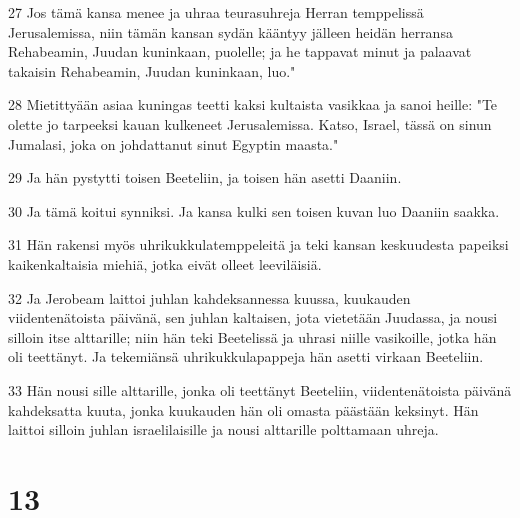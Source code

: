 \par 27 Jos tämä kansa menee ja uhraa teurasuhreja Herran temppelissä Jerusalemissa, niin tämän kansan sydän kääntyy jälleen heidän herransa Rehabeamin, Juudan kuninkaan, puolelle; ja he tappavat minut ja palaavat takaisin Rehabeamin, Juudan kuninkaan, luo."
\par 28 Mietittyään asiaa kuningas teetti kaksi kultaista vasikkaa ja sanoi heille: "Te olette jo tarpeeksi kauan kulkeneet Jerusalemissa. Katso, Israel, tässä on sinun Jumalasi, joka on johdattanut sinut Egyptin maasta."
\par 29 Ja hän pystytti toisen Beeteliin, ja toisen hän asetti Daaniin.
\par 30 Ja tämä koitui synniksi. Ja kansa kulki sen toisen kuvan luo Daaniin saakka.
\par 31 Hän rakensi myös uhrikukkulatemppeleitä ja teki kansan keskuudesta papeiksi kaikenkaltaisia miehiä, jotka eivät olleet leeviläisiä.
\par 32 Ja Jerobeam laittoi juhlan kahdeksannessa kuussa, kuukauden viidentenätoista päivänä, sen juhlan kaltaisen, jota vietetään Juudassa, ja nousi silloin itse alttarille; niin hän teki Beetelissä ja uhrasi niille vasikoille, jotka hän oli teettänyt. Ja tekemiänsä uhrikukkulapappeja hän asetti virkaan Beeteliin.
\par 33 Hän nousi sille alttarille, jonka oli teettänyt Beeteliin, viidentenätoista päivänä kahdeksatta kuuta, jonka kuukauden hän oli omasta päästään keksinyt. Hän laittoi silloin juhlan israelilaisille ja nousi alttarille polttamaan uhreja.

\chapter{13}

